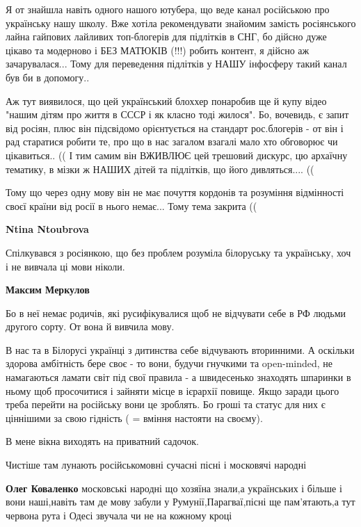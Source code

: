 \begin{itemize}
Я от знайшла навіть одного нашого ютубера, що веде канал російською про
українську нашу школу. Вже хотіла рекомендувати знайомим замість росіянського
лайна гайпових лайливих топ-блогерів для підлітків в СНГ, бо дійсно дуже цікаво
та модерново і БЕЗ МАТЮКІВ (!!!) робить контент, я дійсно аж зачарувалася...
Тому для переведення підлітків у НАШУ інфосферу такий канал був би в допомогу..

Аж тут виявилося, що цей український блоххер понаробив ще й купу відео "нашим
дітям про життя в СССР і як класно тоді жилося". Бо, вочевидь, є запит від
росіян, плюс він підсвідомо орієнтується на стандарт рос.блогерів - от він і
рад старатися робити те, про що в нас загалом взагалі мало хто обговорює чи
цікавиться.. (( І тим самим він ВЖИВЛЮЄ цей трешовий дискурс, цю архаїчну
тематику, в мізки ж НАШИХ дітей та підлітків, що його дивляться.... ((

Тому що через одну мову він не має почуття кордонів та розуміння відмінності
своєї країни від росії в нього немає... Тому тема закрита ((

\begin{itemize} %
\textbf{Ntina Ntoubrova} 

Спілкувався з росіянкою, що без проблем розуміла білоруську та українську, хоч
і не вивчала ці мови ніколи.

\textbf{Максим Меркулов} 

Бо в неї немає родичів, які русифікувалися щоб не відчувати себе в РФ людьми
другого сорту. От вона й вивчила мову.

В нас та в Білорусі українці з дитинства себе відчувають вторинними. А оскільки
здорова амбітність бере своє - то вони, будучи гнучкими та open-minded, не
намагаються ламати світ під свої правила - а швидесенько знаходять шпаринки в
ньому щоб просочитися і зайняти місце в ієрархії повище. Якщо заради цього
треба перейти на російську вони це зроблять. Бо гроші та статус для них є
ціннішими за свою гідність ( = вміння настояти на своєму).

\end{itemize} %


В мене вікна виходять на приватний садочок.

Чистіше там лунають російськомовні сучасні пісні і московячі народні

\begin{itemize} %
\textbf{Олег Коваленко} московські народні що хозяїна знали,а українських і більше і вони наші,навіть там де мову забули у Румунії,Парагваї,пісні ще пам'ятають,а тут червона рута і Одесі звучала чи не на кожному кроці
\end{itemize} %


\end{itemize}
